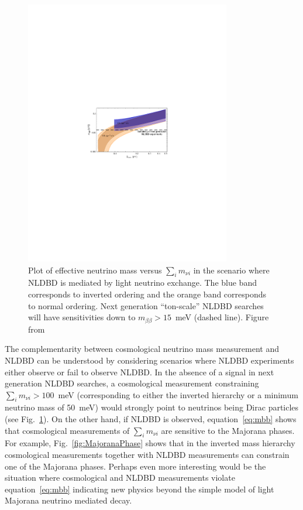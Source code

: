 \begin{figure}[h!]
\centering \includegraphics[width=0.8\textwidth]{Neutrinos/mbb_v_sum_m_nu.pdf}
\caption{Plot of effective neutrino mass versus $\sum_i m_{\nu i}$ in the scenario where NLDBD is mediated by light neutrino exchange. The blue band corresponds to inverted ordering and the orange band corresponds to normal ordering. Next generation ``ton-scale'' NLDBD searches will have sensitivities down to $m_{\beta\beta}>15$~meV (dashed line). Figure from~\cite{Dell'Oro:2014yca}}
\label{fig:NLDBD}
\end{figure}

The complementarity between cosmological neutrino mass measurement and NLDBD can be understood by considering scenarios where NLDBD experiments either observe or fail to observe NLDBD. In the absence of a signal in next generation NLDBD searches, a cosmological measurement constraining $\sum_i m_{\nu i} > 100$~meV (corresponding to either the inverted hierarchy or a minimum neutrino mass of 50~meV) would strongly point to neutrinos being Dirac particles (see Fig.~\ref{fig:NLDBD}). On the other hand, if NLDBD is observed, equation~\ref{eq:mbb} shows that cosmological measurements of $\sum_i m_{\nu i}$ are sensitive to the Majorana phases. For example, Fig.~\ref{fig:MajoranaPhase} shows that in the inverted mass hierarchy cosmological measurements together with NLDBD measurements can constrain one of the Majorana phases. Perhaps even more interesting would be the situation where cosmological and NLDBD measurements violate equation~\ref{eq:mbb} indicating new physics beyond the simple model of light Majorana neutrino mediated decay.

